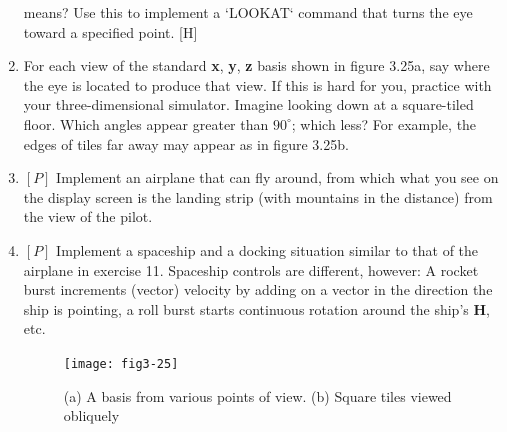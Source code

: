 \documentclass{book}
\begin{document}
\begin{enumerate}
means? Use this to implement a \textsc{`LOOKAT`} command that turns the eye
toward a specified point. [H]
\item For each view of the standard \textbf{x}, \textbf{y}, \textbf{z} basis shown in figure 3.25a, say
where the eye is located to produce that view. If this is hard for you,
practice with your three-dimensional simulator. Imagine looking down
at a square-tiled floor. Which angles appear greater than $90^{\circ}$; which
less? For example, the edges of tiles far away may appear as in figure
3.25b.
\item $[P]$ Implement an airplane that can fly around, from which what
you see on the display screen is the landing strip (with mountains in the
distance) from the view of the pilot.
\item $[P]$ Implement a spaceship and a docking situation similar to that
of the airplane in exercise 11. Spaceship controls are different, however:
A rocket burst increments (vector) velocity by adding on a vector in
the direction the ship is pointing, a roll burst starts continuous rotation
around the ship's \textbf{H}, etc.

\begin{figure}
\begin{center}
\texttt{[image: fig3-25]}
\caption{(a) A basis from various points of view. (b) Square tiles viewed obliquely}
\end{center}
\end{figure}


\end{enumerate}
\end{document}
